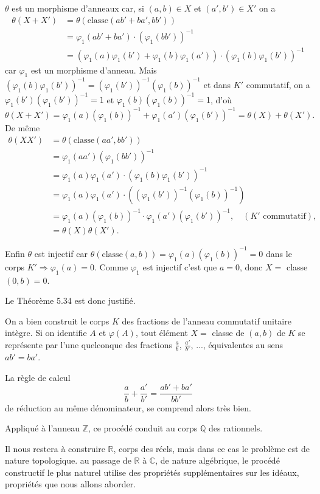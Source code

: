 $\theta$ est un morphisme d'anneaux car, si $(a,b)\in X$ et $(a',b')\in X'$ on a
\begin{align*}
\theta(X+X')&=\theta(\text{classe}(ab'+ba',bb'))\\
&=\varphi_1(ab'+ba')\cdot(\varphi_1(bb'))^{-1}\\
&=(\varphi_1(a)\varphi_1(b')+\varphi_1(b)\varphi_1(a'))\cdot(\varphi_1(b)\varphi_1(b'))^{-1}
\end{align*}
car $\varphi_1$ est un morphisme d'anneau.
Mais $(\varphi_1(b)\varphi_1(b'))^{-1}=(\varphi_1(b'))^{-1}(\varphi_1(b))^{-1}$ et dans $K'$ commutatif, on a $\varphi_1(b')(\varphi_1(b'))^{-1}=1$ et $\varphi_1(b)(\varphi_1(b))^{-1}=1$, d'où
\[
\theta(X+X')=\varphi_1(a)(\varphi_1(b))^{-1}+\varphi_1(a')(\varphi_1(b'))^{-1}=\theta(X)+\theta(X').
\]
De même
\begin{align*}
\theta(XX')&=\theta(\text{classe}(aa',bb'))\\
&=\varphi_1(aa')(\varphi_1(bb'))^{-1}\\
&=\varphi_1(a)\varphi_1(a')\cdot(\varphi_1(b)\varphi_1(b'))^{-1}\\
&=\varphi_1(a)\varphi_1(a')\cdot((\varphi_1(b'))^{-1}(\varphi_1(b))^{-1})\\
&=\varphi_1(a)(\varphi_1(b))^{-1}\cdot\varphi_1(a')(\varphi_1(b'))^{-1},\quad(K'\text{ commutatif}),\\
&=\theta(X)\theta(X').
\end{align*}

Enfin $\theta$ est injectif car $\theta(\text{classe}(a,b))=\varphi_1(a)(\varphi_1(b))^{-1}=0$ dans le corps $K'\Rightarrow\varphi_1(a)=0$. Comme $\varphi_1$ est injectif c'est que $a=0$, donc $X=$ classe$(0,b)=0$.

Le Théorème 5.34 est donc justifié.

On a bien construit le corps $K$ des fractions de l'anneau commutatif unitaire intègre. Si on identifie $A$ et $\varphi(A)$, tout élément $X=$ classe de $(a,b)$ de $K$ se représente par l'une quelconque des fractions $\frac ab$, $\frac{a'}{b'}$, ..., équivalentes au sens $ab'=ba'$.

La règle de calcul
\[
\frac ab+\frac{a'}{b'}=\frac{ab'+ba'}{bb'}
\]
de réduction au même dénominateur, se comprend alors très bien.

Appliqué à l'anneau $\mathbb Z$, ce procédé conduit au corps $\mathbb Q$ des rationnels.

Il nous restera à construire $\mathbb R$, corps des réels, mais dans ce cas le problème est de nature topologique.  au passage de $\mathbb R$ à $\mathbb C$, de nature algébrique, le procédé constructif le plus naturel utilise des propriétés supplémentaires sur les idéaux, propriétés que nous allons aborder.

